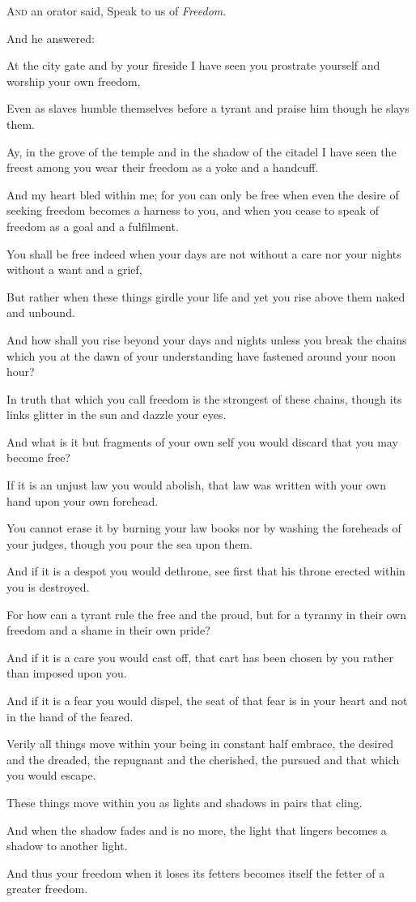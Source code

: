 
\lettrine{A}{nd} an orator said, Speak to us of
\textit{Freedom}.

\medskip
And he answered:

At the city gate and by your fireside
I have seen you prostrate yourself and
worship your own freedom,

Even as slaves humble themselves before
a tyrant and praise him though he slays
them.

Ay, in the grove of the temple and in
the shadow of the citadel I have seen
the freest among you wear their freedom
as a yoke and a handcuff.

And my heart bled within me; for you
can only be free when even the desire
of seeking freedom becomes a harness
to you, and when you cease to speak of
freedom as a goal and a fulfilment.

You shall be free indeed when your
days are not without a care nor your
nights without a want and a grief,

But rather when these things girdle your
life and yet you rise above them naked
and unbound.



And how shall you rise beyond your days
and nights unless you break the
chains which you at the dawn of your
understanding have fastened around your
noon hour?

In truth that which you call freedom is
the strongest of these chains, though
its links glitter in the sun and dazzle
your eyes.

And what is it but fragments of your
own self you would discard that you may
become free?

If it is an unjust law you would
abolish, that law was written with your
own hand upon your own forehead.

You cannot erase it by burning your law
books nor by washing the foreheads of
your judges, though you pour the sea
upon them.

And if it is a despot you would
dethrone, see first that his throne
erected within you is destroyed.

For how can a tyrant rule the free and
the proud, but for a tyranny in their
own freedom and a shame in their own
pride?

And if it is a care you would cast off,
that cart has been chosen by you rather
than imposed upon you.

And if it is a fear you would dispel,
the seat of that fear is in your heart
and not in the hand of the feared.



Verily all things move within your being
in constant half embrace, the desired
and the dreaded, the repugnant and the
cherished, the pursued and that which
you would escape.

These things move within you as lights
and shadows in pairs that cling.

And when the shadow fades and is no
more, the light that lingers becomes a
shadow to another light.

And thus your freedom when it loses its
fetters becomes itself the fetter of a
greater freedom.
